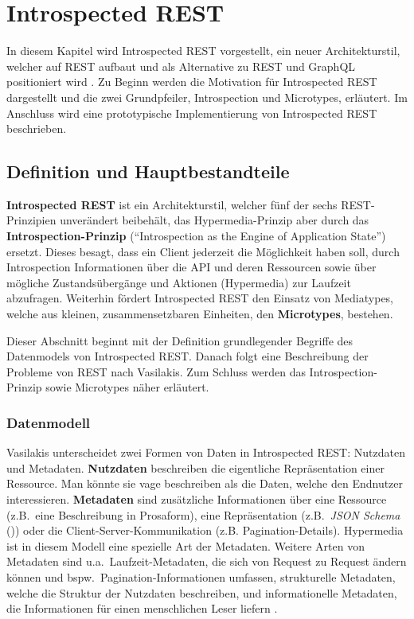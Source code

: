 \chapter{Introspected REST}\label{ch:intrest}

In diesem Kapitel wird Introspected REST vorgestellt, ein neuer Architekturstil, welcher auf REST aufbaut und als Alternative zu REST und GraphQL positioniert wird \autocite{Vasilakis2017}. Zu Beginn werden die Motivation für Introspected REST dargestellt und die zwei Grundpfeiler, Introspection und Microtypes, erläutert. Im Anschluss wird eine prototypische Implementierung von Introspected REST beschrieben.

\section{Definition und Hauptbestandteile}\label{sec:intrest|theory}

\textbf{Introspected REST} ist ein Architekturstil, welcher fünf der sechs REST-Prinzipien unverändert beibehält, das Hypermedia-Prinzip aber durch das \textbf{Introspection-Prinzip} (\enquote{Introspection as the Engine of Application State}) ersetzt. Dieses besagt, dass ein Client jederzeit die Möglichkeit haben soll, durch Introspection Informationen über die API und deren Ressourcen sowie über mögliche Zustandsübergänge und Aktionen (Hypermedia) zur Laufzeit abzufragen. Weiterhin fördert Introspected REST den Einsatz von Mediatypes, welche aus kleinen, zusammensetzbaren Einheiten, den \textbf{Microtypes}, bestehen.

Dieser Abschnitt beginnt mit der Definition grundlegender Begriffe des Datenmodels von Introspected REST\@. Danach folgt eine Beschreibung der Probleme von REST nach Vasilakis. Zum Schluss werden das Introspection-Prinzip sowie Microtypes näher erläutert.

\subsection{Datenmodell}
Vasilakis unterscheidet zwei Formen von Daten in Introspected REST: Nutzdaten und Metadaten. \textbf{Nutzdaten} beschreiben die eigentliche Repräsentation einer Ressource. Man könnte sie vage beschreiben als die Daten, welche den Endnutzer interessieren. \textbf{Metadaten} sind zusätzliche Informationen über eine Ressource (z.B.\ eine Beschreibung in Prosaform), eine Repräsentation (z.B.\ \textit{JSON Schema} (\autocites{JsonSchemaCore}{JsonSchemaValidation})) oder die Client-Server-Kommunikation (z.B. Pagination-Details). Hypermedia ist in diesem Modell eine spezielle Art der Metadaten. Weitere Arten von Metadaten sind u.a.\ Laufzeit-Metadaten, die sich von Request zu Request ändern können und bspw.\ Pagination-Informationen umfassen, strukturelle Metadaten, welche die Struktur der Nutzdaten beschreiben, und informationelle Metadaten, die Informationen für einen menschlichen Leser liefern \autocite[Abs.~9.1]{Vasilakis2017}.

